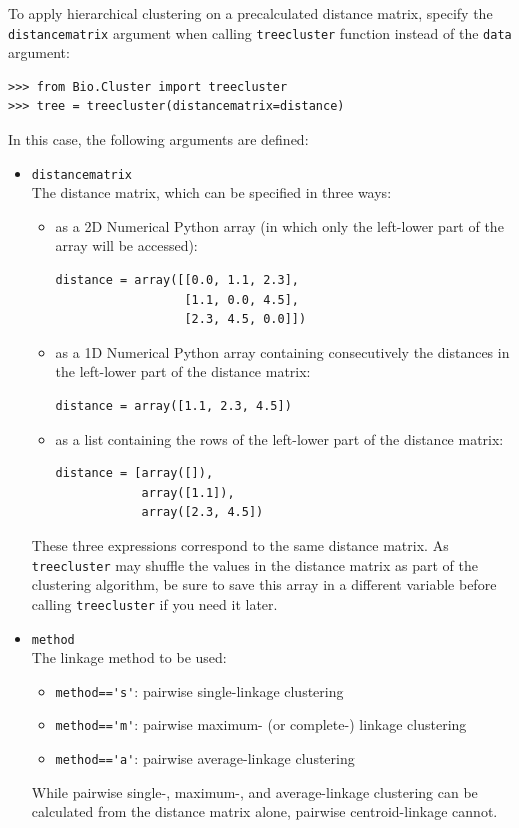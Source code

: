 \documentclass{report}
\begin{document}
To apply hierarchical clustering on a precalculated distance matrix, specify the \verb|distancematrix| argument when calling \verb|treecluster| function instead of the \verb|data| argument:
\begin{verbatim}
>>> from Bio.Cluster import treecluster
>>> tree = treecluster(distancematrix=distance)
\end{verbatim}
In this case, the following arguments are defined:
\begin{itemize}
\item \verb|distancematrix| \\
The distance matrix, which can be specified in three ways:
\begin{itemize}
\item as a 2D Numerical Python array (in which only the left-lower part of the array will be accessed):
\begin{verbatim}
distance = array([[0.0, 1.1, 2.3], 
                  [1.1, 0.0, 4.5],
                  [2.3, 4.5, 0.0]])
\end{verbatim}
\item as a 1D Numerical Python array containing consecutively the distances in the left-lower part of the distance matrix:
\begin{verbatim}
distance = array([1.1, 2.3, 4.5])
\end{verbatim}
\item as a list containing the rows of the left-lower part of the distance matrix:
\begin{verbatim}
distance = [array([]),
            array([1.1]),
            array([2.3, 4.5])
\end{verbatim}
\end{itemize}
These three expressions correspond to the same distance matrix.
As \verb|treecluster| may shuffle the values in the distance matrix as part of the clustering algorithm, be sure to save this array in a different variable before calling \verb|treecluster| if you need it later.
\item \verb|method| \\
The linkage method to be used:
\begin{itemize}
\item \verb|method=='s'|: pairwise single-linkage clustering
\item \verb|method=='m'|: pairwise maximum- (or complete-) linkage clustering
\item \verb|method=='a'|: pairwise average-linkage clustering
\end{itemize}
While pairwise single-, maximum-, and average-linkage clustering can be calculated from the distance matrix alone, pairwise centroid-linkage cannot.
\end{itemize}
\end{document}

